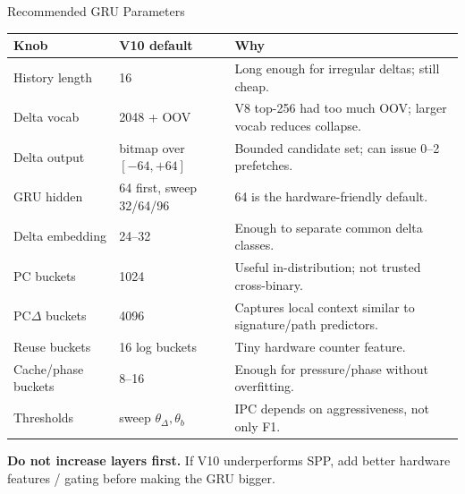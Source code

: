 \documentclass[10pt,aspectratio=169]{beamer}
\begin{document}
\begin{frame}{Recommended GRU Parameters}
  \begin{center}
  \footnotesize
  \begin{tabular}{lll}
    \toprule
    \textbf{Knob} & \textbf{V10 default} & \textbf{Why} \\
    \midrule
    History length & 16 & Long enough for irregular deltas; still cheap. \\
    Delta vocab & 2048 + OOV & V8 top-256 had too much OOV; larger vocab reduces collapse. \\
    Delta output & bitmap over $[-64,+64]$ & Bounded candidate set; can issue 0--2 prefetches. \\
    GRU hidden & 64 first, sweep 32/64/96 & 64 is the hardware-friendly default. \\
    Delta embedding & 24--32 & Enough to separate common delta classes. \\
    PC buckets & 1024 & Useful in-distribution; not trusted cross-binary. \\
    PC$\Delta$ buckets & 4096 & Captures local context similar to signature/path predictors. \\
    Reuse buckets & 16 log buckets & Tiny hardware counter feature. \\
    Cache/phase buckets & 8--16 & Enough for pressure/phase without overfitting. \\
    Thresholds & sweep $\theta_\Delta,\theta_b$ & IPC depends on aggressiveness, not only F1. \\
    \bottomrule
  \end{tabular}
  \end{center}

  \vspace{0.4em}
  \textbf{Do not increase layers first.}
  If V10 underperforms SPP, add better hardware features / gating before making the GRU bigger.
\end{frame}
\end{document}
